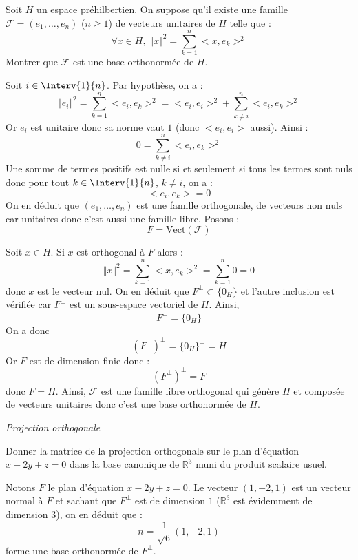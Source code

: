\documentclass[a4paper,10pt]{report}
\begin{document}
 
\begin{Exa} Soit $H$ un espace préhilbertien. On suppose qu'il existe une famille $\mathcal{F}=(e_1, \ldots, e_n)$ ($n \geq 1$) de vecteurs unitaires de $H$ telle que :
$$ \forall x \in H, \; \Vert x \Vert^2= \sum_{k=1}^n <x,e_k>^2 $$
Montrer que $\mathcal{F}$ est une base orthonormée de $H$.
\end{Exa}

\corr Soit $i \in \Interv{1}{n}$. Par hypothèse, on a :
$$ \Vert e_i \Vert^2= \sum_{k=1}^n <e_i,e_k>^2 = <e_i,e_i>^2 + \sum_{k \neq i}^n <e_i,e_k>^2 $$
Or $e_i$ est unitaire donc sa norme vaut $1$ (donc $<e_i,e_i>$ aussi). Ainsi :
$$ 0 =  \sum_{k \neq i}^n <e_i,e_k>^2 $$
Une somme de termes positifs est nulle si et seulement si tous les termes sont nuls donc pour tout $k \in \Interv{1}{n}$, $k \neq i$, on a :
$$<e_i,e_k>=0$$
On en déduit que $(e_1, \ldots, e_n)$ est une famille orthogonale, de vecteurs non nuls car unitaires donc c'est aussi une famille libre. Posons :
$$ F = \textrm{Vect}(\mathcal{F})$$

\medskip

\noindent Soit $x \in H$. Si $x$ est orthogonal à $F$ alors :
$$ \Vert x \Vert^2= \sum_{k=1}^n <x,e_k>^2 = \sum_{k=1}^n  0 = 0$$
donc $x$ est le vecteur nul. On en déduit que $F^{\perp} \subset \lbrace 0_H \rbrace$ et l'autre inclusion est vérifiée car $F^{\perp}$ est un sous-espace vectoriel de $H$. Ainsi,
$$ F^{\perp} = \lbrace 0_H \rbrace$$
On a donc 
$$ (F^{\perp})^{\perp} = \lbrace 0_H \rbrace^{\perp} = H$$
Or $F$ est de dimension finie donc :
$$ (F^{\perp})^{\perp} = F$$
donc $F=H$. Ainsi, $\mathcal{F}$ est une famille libre orthogonal qui génère $H$ et composée de vecteurs unitaires donc c'est une base orthonormée de $H$.



\medskip

\begin{center}
\textit{{ {\large Projection orthogonale}}}
\end{center}

\medskip

\begin{Exa} Donner la matrice de la projection orthogonale sur le plan d'équation $x-2y+z=0$ dans la base canonique de $\mathbb{R}^3$ muni du produit scalaire usuel.
\end{Exa}

\corr Notons $F$ le plan d'équation $x-2y+z=0$. Le vecteur $(1,-2,1)$ est un vecteur normal à $F$ et sachant que $F^{\perp}$ est de dimension $1$ ($\mathbb{R}^3$ est évidemment de dimension $3$), on en déduit que :
$$ n = \dfrac{1}{\sqrt{6}} (1,-2,1)$$
forme une base orthonormée de $F^{\perp}$. 
\end{document}
